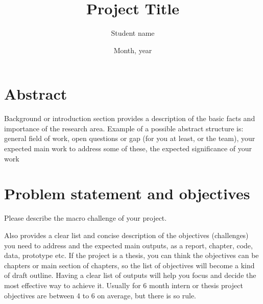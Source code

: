 \documentclass{article}
\title{Project Title}
\author{Student name}
\date{Month, year}
\begin{document}
\maketitle

\section{Abstract}
Background or introduction  section provides  a description  of the basic  facts and importance  of the research area. Example of a possible abstract structure is: general field of work, open questions or gap (for you at least, or the team), your expected main work to address some of these, the expected significance of your work



\section{Problem statement and objectives }
Please describe the macro challenge of your project.

Also provides  a clear list and concise description  of the objectives (challenges) you need to address and the expected main outputs, as a report, chapter, code, data, prototype etc. If the project is a thesis, you can think the objectives can be chapters or main section of chapters, so the list of objectives will become a kind of draft outline. Having a clear list of outputs will help you focus and decide the most effective way to achieve it. Usually for 6 month intern or thesis project objectives are between 4 to 6 on average, but there is so rule.


\end{document}
